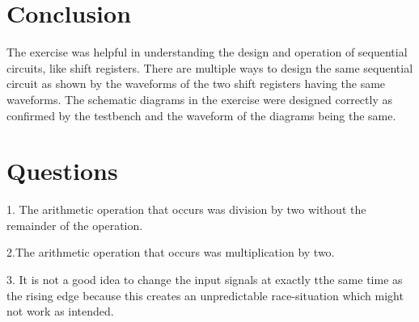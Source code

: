 \documentclass[CMPE]{KGCOEReport}
\begin{document}
\section*{Conclusion}
The exercise was helpful in understanding the design and operation of sequential circuits, like shift registers. There are multiple ways to design the same sequential circuit as shown by the waveforms of the two shift registers having the same waveforms. The schematic diagrams in the exercise were designed correctly as confirmed by the testbench and the waveform of the diagrams being the same.

\section*{Questions}
1. The arithmetic operation that occurs was division by two without the remainder of the operation.

2.The arithmetic operation that occurs was multiplication by two.

3. It is not a good idea to change the input signals at exactly tthe same time as the rising edge because this creates an unpredictable race-situation which might not work as intended.
\end{document}
